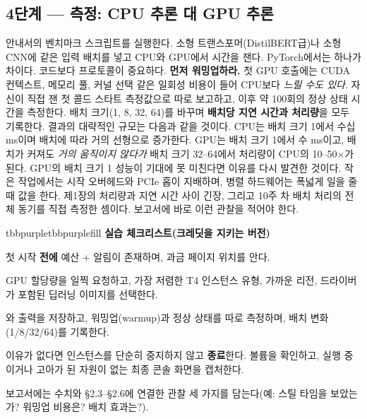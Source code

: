 \subsection*{4단계 — 측정: CPU 추론 대 GPU 추론}

안내서의 벤치마크 스크립트를 실행한다. 소형 트랜스포머(DistilBERT급)나 소형 CNN에 같은 입력 배치를 넣고 CPU와 GPU에서 시간을 잰다. PyTorch에서는  하나가 차이다. 코드보다 프로토콜이 중요하다. \textbf{먼저 워밍업하라.} 첫 GPU 호출에는 CUDA 컨텍스트, 메모리 풀, 커널 선택 같은 일회성 비용이 들어 CPU보다 \textit{느릴 수도 있다}. 자신이 직접 잰 첫 콜드 스타트 측정값으로 따로 보고하고, 이후 약 100회의 정상 상태 시간을 측정한다. 배치 크기(1, 8, 32, 64)를 바꾸며 \textbf{배치당 지연 시간과 처리량}을 모두 기록한다. 결과의 대략적인 규모는 다음과 같을 것이다. CPU는 배치 크기 1에서 수십 ms이며 배치에 따라 거의 선형으로 증가한다. GPU는 배치 크기 1에서 수 ms이고, 배치가 커져도 \textit{거의 움직이지 않다가} 배치 크기 32–64에서 처리량이 CPU의 10–50×가 된다. GPU의 배치 크기 1 성능이 기대에 못 미친다면 이유를 다시 발견한 것이다. 작은 작업에서는 시작 오버헤드와 PCIe 홉이 지배하며, 병렬 하드웨어는 폭넓게 일을 줄 때 값을 한다. 제1장의 처리량과 지연 시간 사이 긴장, 그리고 10주 차 배치 처리의 전체 동기를 직접 측정한 셈이다. 보고서에 바로 이런 관찰을 적어야 한다.

\begin{calloutbox}{tbbpurple}{tbbpurplefill}
{\normalsize\bfseries\color{tbbpurple}실습 체크리스트(크레딧을 지키는 버전)}\par\vspace{3pt}
\begin{tbbitemize}
  \item 첫 시작 \textbf{전에} 예산 + 알림이 존재하며, 과금 페이지 위치를 안다.
  \item GPU 할당량을 일찍 요청하고, 가장 저렴한 T4 인스턴스 유형, 가까운 리전, 드라이버가 포함된 딥러닝 이미지를 선택한다.
  \item {}와  출력을 저장하고, 워밍업(warmup)과 정상 상태를 따로 측정하며, 배치 변화(1/8/32/64)를 기록한다.
  \item 이유가 없다면 인스턴스를 단순히 중지하지 않고 \textbf{종료}한다. 볼륨을 확인하고, 실행 중이거나 고아가 된 자원이 없는 최종 콘솔 화면을 캡처한다.
  \item 보고서에는 수치와 §2.3–§2.6에 연결한 관찰 세 가지를 담는다(예: 스틸 타임을 보았는가? 워밍업 비용은? 배치 효과는?).
\end{tbbitemize}
\end{calloutbox}

